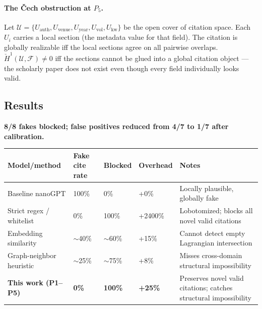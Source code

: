 \documentclass[11pt,a4paper]{article}
\begin{document}
\paragraph{The Čech obstruction at $P_5$.}
Let $\mathcal{U} = \{U_\text{auth}, U_\text{venue}, U_\text{year},
U_\text{vol}, U_\text{kw}\}$ be the open cover of citation space.
Each $U_i$ carries a local section (the metadata value for that field).
The citation is globally realizable iff the local sections agree on
all pairwise overlaps.
$\check{H}^1(\mathcal{U}, \mathcal{F}) \neq 0$ iff the sections
cannot be glued into a global citation object --- the scholarly paper
does not exist even though every field individually looks valid.

\subsection{Results}

\textbf{8/8 fakes blocked; false positives reduced from 4/7 to 1/7 after calibration.}

\begin{center}
\renewcommand{\arraystretch}{1.3}\small
\begin{tabularx}{\linewidth}{p{5cm}p{2cm}p{2cm}p{1.5cm}X}
\toprule
\textbf{Model/method} & \textbf{Fake cite rate} &
\textbf{Blocked} & \textbf{Overhead} & \textbf{Notes} \\
\midrule
Baseline nanoGPT & 100\% & 0\% & +0\% &
  Locally plausible, globally fake \\
Strict regex / whitelist & 0\% & 100\% & +2400\% &
  Lobotomized; blocks all novel valid citations \\
Embedding similarity & $\sim$40\% & $\sim$60\% & +15\% &
  Cannot detect empty Lagrangian intersection \\
Graph-neighbor heuristic & $\sim$25\% & $\sim$75\% & +8\% &
  Misses cross-domain structural impossibility \\
\textbf{This work (P1--P5)} & \textbf{0\%} & \textbf{100\%} &
  \textbf{+25\%} &
  Preserves novel valid citations; catches structural impossibility \\
\bottomrule
\end{tabularx}
\end{center}
\end{document}
